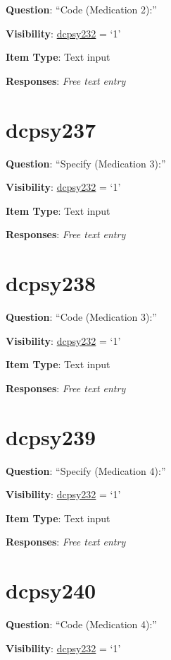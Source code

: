 \documentclass[]{book}
\begin{document}
\textbf{Question}: ``Code (Medication 2):''

\textbf{Visibility}: \protect\hyperlink{dcpsy232}{dcpsy232} = `1'

\textbf{Item Type}: Text input

\textbf{Responses}: \emph{Free text entry}

\hypertarget{dcpsy237}{%
\section{dcpsy237}\label{dcpsy237}}

\textbf{Question}: ``Specify (Medication 3):''

\textbf{Visibility}: \protect\hyperlink{dcpsy232}{dcpsy232} = `1'

\textbf{Item Type}: Text input

\textbf{Responses}: \emph{Free text entry}

\hypertarget{dcpsy238}{%
\section{dcpsy238}\label{dcpsy238}}

\textbf{Question}: ``Code (Medication 3):''

\textbf{Visibility}: \protect\hyperlink{dcpsy232}{dcpsy232} = `1'

\textbf{Item Type}: Text input

\textbf{Responses}: \emph{Free text entry}

\hypertarget{dcpsy239}{%
\section{dcpsy239}\label{dcpsy239}}

\textbf{Question}: ``Specify (Medication 4):''

\textbf{Visibility}: \protect\hyperlink{dcpsy232}{dcpsy232} = `1'

\textbf{Item Type}: Text input

\textbf{Responses}: \emph{Free text entry}

\hypertarget{dcpsy240}{%
\section{dcpsy240}\label{dcpsy240}}

\textbf{Question}: ``Code (Medication 4):''

\textbf{Visibility}: \protect\hyperlink{dcpsy232}{dcpsy232} = `1'
\end{document}
